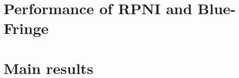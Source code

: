 \section{Performance of RPNI and Blue-Fringe\label{subsection_stamina_baseline}}



\section{Main results\label{subsection_stamina_results}}



